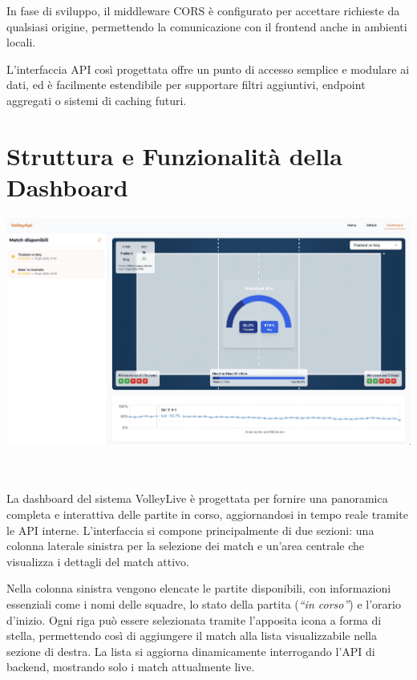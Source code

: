 \documentclass[a4paper,12pt]{report}
\begin{document}
In fase di sviluppo, il middleware CORS è configurato per accettare richieste da qualsiasi origine, permettendo la comunicazione con il frontend anche in ambienti locali.

L’interfaccia API così progettata offre un punto di accesso semplice e modulare ai dati, ed è facilmente estendibile per supportare filtri aggiuntivi, endpoint aggregati o sistemi di caching futuri.


\section{Struttura e Funzionalità della Dashboard}

\noindent\begin{minipage}{\textwidth}
  \centering
  \includegraphics[width=\textwidth]{dashboard.png}
  \label{fig:dashboard}
\end{minipage}

\\
\\
La dashboard del sistema VolleyLive è progettata per fornire una panoramica completa e interattiva delle partite in corso, aggiornandosi in tempo reale tramite le API interne. L’interfaccia si compone principalmente di due sezioni: una colonna laterale sinistra per la selezione dei match e un’area centrale che visualizza i dettagli del match attivo.

Nella colonna sinistra vengono elencate le partite disponibili, con informazioni essenziali come i nomi delle squadre, lo stato della partita (\textit{``in corso''}) e l’orario d’inizio. Ogni riga può essere selezionata tramite l'apposita icona a forma di stella, permettendo così di aggiungere il match alla lista visualizzabile nella sezione di destra. La lista si aggiorna dinamicamente interrogando l’API di backend, mostrando solo i match attualmente live.
\end{document}

